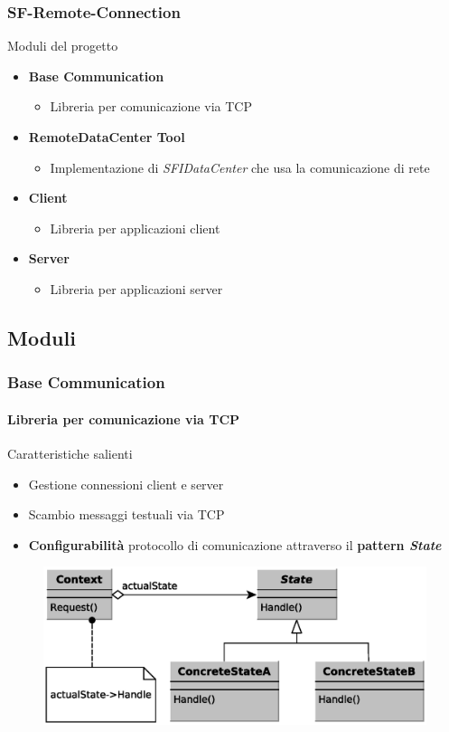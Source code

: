\documentclass[ignorenonframetext,8pt]{beamer}
\begin{document}
	\begin{frame}
		\frametitle{SF-Remote-Connection}
		\begin{block}{Moduli del progetto}
			\begin{itemize}
				\item \textbf{Base Communication}
					\begin{itemize}
						\item Libreria per comunicazione via TCP
					\end{itemize}
				\item \textbf{RemoteDataCenter Tool}
					\begin{itemize}
						\item Implementazione di \textit{SFIDataCenter} che usa la comunicazione di rete
					\end{itemize}
				\item \textbf{Client}
					\begin{itemize}
						\item Libreria per applicazioni client
					\end{itemize}
				\item \textbf{Server}
					\begin{itemize}
						\item Libreria per applicazioni server
					\end{itemize}
			\end{itemize}
		\end{block}
	\end{frame}
	
	\subsection{Moduli}
	\begin{frame}
		\frametitle{Base Communication}
		\framesubtitle{Libreria per comunicazione via TCP}
		\begin{block}{Caratteristiche salienti}
			\begin{itemize}
				\item Gestione connessioni client e server
				\item Scambio messaggi testuali via TCP
				\item \textbf{Configurabilit\`a} protocollo di comunicazione attraverso il \textbf{pattern \textit{State}}
			\end{itemize}
			\begin{figure}
				\includegraphics[width=.70\textwidth]{Immagini/StatePattern}
			\end{figure}
		\end{block}
	\end{frame}
\end{document}

